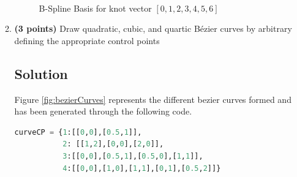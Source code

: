 \documentclass[a4paper, 11pt]{article}
\begin{document}
\begin{enumerate}
\begin{enumerate}[label=\alph*.]
\begin{figure}[ht]
{  } \\
  \quad 
  \quad 
  \caption{B-Spline Basis for knot vector \([0,1,2,3,4,5,6]\)} 
  \label{fig:bsplineBasis}
\end{figure}
    \item \textbf{(3 points)} Draw quadratic, cubic, and quartic B\'{e}zier curves by arbitrary defining the appropriate control points 
    \subsection*{Solution}
    Figure \ref{fig:bezierCurves} represents the different bezier curves formed and has been generated through the following code.
    \begin{lstlisting}[language=Python]
curveCP = {1:[[0,0],[0.5,1]], 
           2: [[1,2],[0,0],[2,0]],
           3:[[0,0],[0.5,1],[0.5,0],[1,1]],
           4:[[0,0],[1,0],[1,1],[0,1],[0.5,2]]}  
           

\end{lstlisting}
\end{enumerate}
\end{enumerate}
\end{document}
